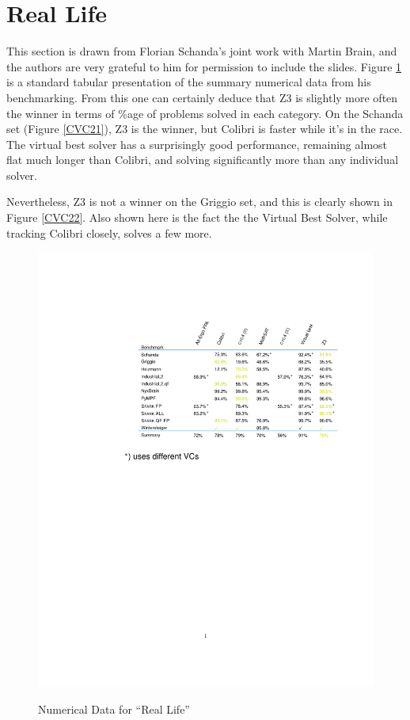 \documentclass{easychair}
\begin{document}
\section{Real Life}\label{sec:RL}
This section is drawn from Florian Schanda's joint work with Martin Brain, and the authors are very grateful to him for permission to include the slides.  Figure \ref{CVC16} is a standard tabular presentation of the summary numerical data from his benchmarking. From this one can certainly deduce that Z3 is slightly more  often the winner in terms of \%age of problems solved in each category. 
On the Schanda set (Figure \ref{CVC21}), Z3 is the winner, but Colibri is faster while it's in the race. The virtual best solver has a surprisingly good performance, remaining almost flat much longer than Colibri, and solving significantly more than any individual solver.
\par
 Nevertheless, Z3 is not a winner on the Griggio set, and this is clearly shown in Figure \ref{CVC22}. Also shown here is the fact the the Virtual Best Solver, while tracking Colibri closely, solves a few more. 
\begin{figure}[h]
\caption{Numerical Data for ``Real Life''\label{CVC16}}
\vskip-120pt
{\hskip-180pt\includegraphics{ExtractCVC16trimv2.pdf}}\vskip-200pt
\end{figure}\iffalse
\end{document}
